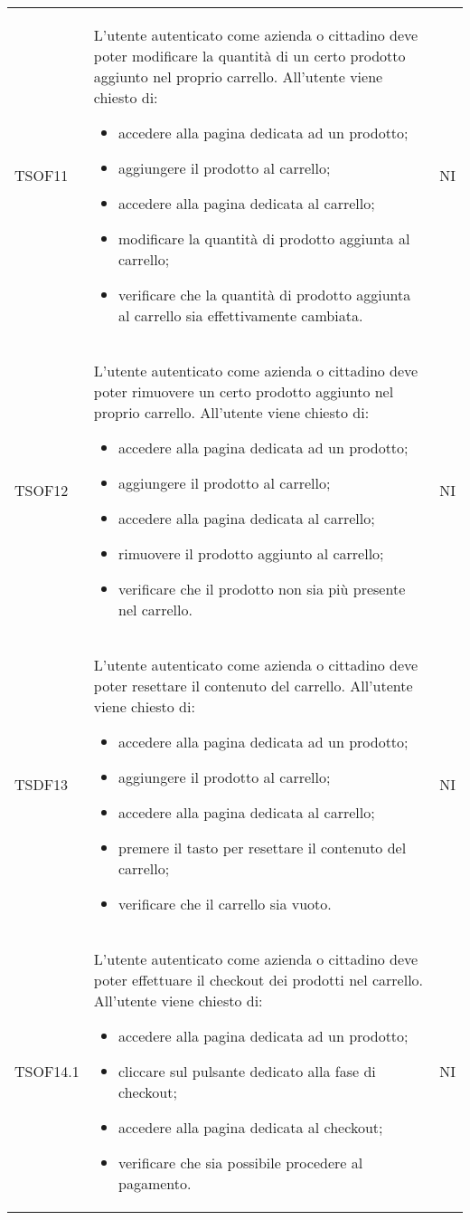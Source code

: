 \begin{longtable}{ >{\centering}p{} >{\centering}p{}
			>{\centering}p{}}
		TSOF11	&	L'utente autenticato come azienda o cittadino deve poter modificare la 
		quantità di un certo prodotto aggiunto nel proprio carrello. All'utente viene
		chiesto di:
		\begin{itemize}
			\item accedere alla pagina dedicata ad un prodotto;
			\item aggiungere il prodotto al carrello;
			\item accedere alla pagina dedicata al carrello;
			\item modificare la quantità di prodotto aggiunta al carrello;
			\item verificare che la quantità di prodotto aggiunta al carrello sia
			effettivamente cambiata.
		\end{itemize}	&	NI
		\tabularnewline
		
		TSOF12	&	L'utente autenticato come azienda o cittadino deve poter rimuovere un
		certo prodotto aggiunto nel proprio carrello. All'utente viene chiesto di:
		\begin{itemize}
			\item accedere alla pagina dedicata ad un prodotto;
			\item aggiungere il prodotto al carrello;
			\item accedere alla pagina dedicata al carrello;
			\item rimuovere il prodotto aggiunto al carrello;
			\item verificare che il prodotto non sia più presente nel carrello.
		\end{itemize}	&	NI
		\tabularnewline
		
		TSDF13	&	L'utente autenticato come azienda o cittadino deve poter resettare il
		contenuto del carrello. All'utente viene chiesto di:
		\begin{itemize}
			\item accedere alla pagina dedicata ad un prodotto;
			\item aggiungere il prodotto al carrello;
			\item accedere alla pagina dedicata al carrello;
			\item premere il tasto per resettare il contenuto del carrello;
			\item verificare che il carrello sia vuoto.
		\end{itemize}	&	NI
		\tabularnewline
		
		TSOF14.1	&	L'utente autenticato come azienda o cittadino deve poter effettuare il
		checkout dei prodotti nel carrello. All'utente viene chiesto di:
		\begin{itemize}
			\item accedere alla pagina dedicata ad un prodotto;
			\item cliccare sul pulsante dedicato alla fase di checkout;
			\item accedere alla pagina dedicata al checkout;
			\item verificare che sia possibile procedere al pagamento.
		\end{itemize}	&	NI
		\tabularnewline
		

\end{longtable}
